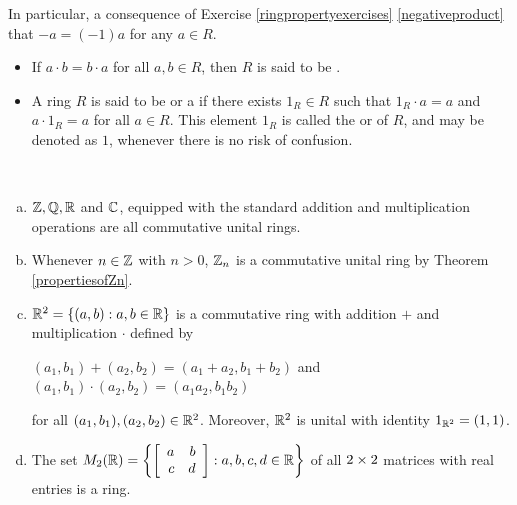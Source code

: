 \documentclass[11pt,fleqn,dvipsnames,usenames]{article}
\newcommand{\p}{\noindent}
\begin{document}
%
\p In particular, a consequence of Exercise \ref{ringpropertyexercises} \ref{negativeproduct} that $-a = (-1)a$ for any $a\in R$.
\vsp

\terminology
\begin{itemize}
\item If $a\cdot b = b\cdot a$ for all $a,b\in R$, then $R$ is said to be .
\item A ring $R$ is said to be  or a  if there exists $1_{R}\in R$ such that $1_{R}\cdot a = a$ and $a\cdot 1_{R} = a$ for all $a\in R$.  This element $1_{R}$ is called the  or  of $R$, and may be denoted as $1$, whenever there is no risk of confusion.
\end{itemize}
%
\begin{examples}\label{ringexamples}~
\begin{enumerate}[(a)]
\item $\Z, \RATIONAL, \REAL$ and $\COMPLEX$, equipped with the standard addition and multiplication operations are all commutative unital rings.
\item Whenever $n\in\Z$ with $n > 0$, $\ZN$ is a commutative unital ring by Theorem \ref{propertiesofZn}.
\item\label{Rsquared} $\REAL^{2} = \SET{(a,b):a,b\in\REAL}$ is a commutative ring with addition $+$ and multiplication $\cdot$ defined by
\begin{center}
$(a_1,b_1) + (a_2,b_2) = (a_1 + a_2,b_1 + b_2)$ and $(a_1,b_1) \cdot (a_2,b_2) = (a_1a_2,b_1b_2)$
\end{center}
for all $(a_1,b_1), (a_2,b_2)\in\REAL^{2}$.  Moreover, $\REAL^{2}$ is unital with identity $1_{\REAL^{2}} = (1,1)$.
\item The set $M_{2}(\REAL) = \SET{\MATRIX{rr}{a & b\\c&d}:a,b,c,d\in\REAL}$ of all $2\BY 2$ matrices with real entries is a ring.


\end{enumerate}
\end{examples}
\end{document}
